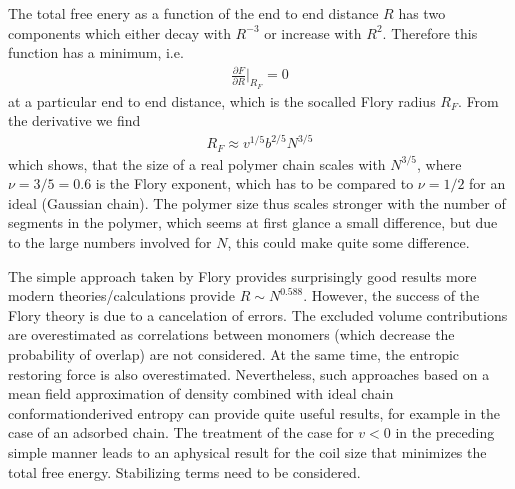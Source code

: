 \documentclass[letterpaper,10pt,english]{sphinxmanual}
\begin{document}
\sphinxAtStartPar
The total free enery as a function of the end to end distance \(R\) has two components which either decay with \(R^{-3}\) or increase with \(R^2\). Therefore this function has a minimum, i.e.
\begin{equation*}
\begin{split}\frac{\partial F}{ \partial R}\bigg |_{R_{F}}=0\end{split}
\end{equation*}
\sphinxAtStartPar
at a particular end to end distance, which is the so\sphinxhyphen{}called Flory radius \(R_F\). From the derivative we find
\begin{equation*}
\begin{split}R_{F} \approx v^{1 / 5} b^{2 / 5} N^{3 / 5}\end{split}
\end{equation*}
\sphinxAtStartPar
which shows, that the size of a real polymer chain scales with \(N^{3 / 5}\), where \(\nu=3/5=0.6\) is the Flory exponent, which has to be compared to \(\nu=1/2\) for an ideal (Gaussian chain). The polymer size thus scales stronger with the number of segments in the polymer, which seems at first glance a small difference, but due to the large numbers involved for \(N\), this could make quite some difference.

\sphinxAtStartPar
{}

\sphinxAtStartPar
The simple approach taken by Flory provides surprisingly good results \sphinxhyphen{} more modern theories/calculations provide \(R ∼ N^{0.588}\). However, the success of the Flory theory is due to a cancelation of errors. The excluded volume contributions are overestimated as correlations between monomers (which decrease the probability of overlap) are not considered. At the same time, the entropic restoring force is also overestimated. Nevertheless, such approaches based on a mean field approximation of
density combined with ideal chain conformation\sphinxhyphen{}derived entropy can provide quite useful results, for example in the case of an adsorbed chain. The treatment of the case for \(v < 0\) in the preceding simple manner leads to an aphysical result for the coil size that minimizes the total free energy. Stabilizing terms need to be considered.
\end{document}
